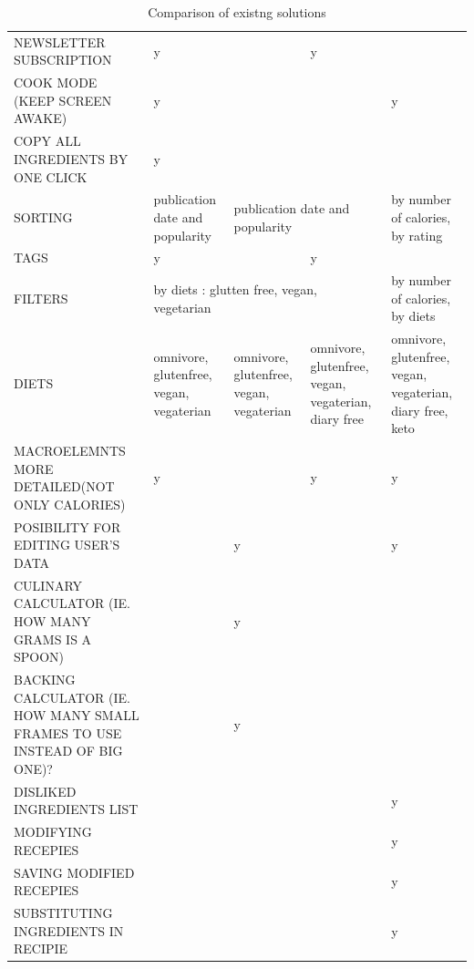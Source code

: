 \begin{landscape}
\begin{table}[H]
{\begin{tabular}{lllll}
NEWSLETTER SUBSCRIPTION                                                     & y             &                               & y                            &            \\
COOK MODE (KEEP SCREEN AWAKE)                                               & y             &                               &                              & y          \\
COPY ALL INGREDIENTS BY ONE CLICK                                           & y             &                               &                              &            \\
SORTING &
  publication date and popularity &
  \multicolumn{2}{l}{publication date and popularity} &
  by number of calories, by rating \\
TAGS                                                                        & y             &                               & y                            &            \\
FILTERS &
  \multicolumn{3}{l}{by diets : glutten free, vegan,   vegetarian} &
  by number of calories, by diets \\
DIETS &
  omnivore, glutenfree, vegan, vegaterian &
  omnivore, glutenfree, vegan, vegaterian &
  omnivore, glutenfree, vegan, vegaterian, diary free &
  omnivore, glutenfree, vegan, vegaterian, diary free, keto \\
MACROELEMNTS MORE DETAILED(NOT ONLY   CALORIES)                             & y             &                               & y                            & y          \\
POSIBILITY FOR EDITING USER'S DATA                                          &               & y                             &                              & y          \\
CULINARY CALCULATOR (IE. HOW MANY GRAMS   IS A SPOON)                       &               & y                             &                              &            \\
BACKING CALCULATOR (IE. HOW MANY SMALL   FRAMES TO USE INSTEAD OF BIG ONE)? &               & y                             &                              &            \\
DISLIKED INGREDIENTS LIST                                                   &               &                               &                              & y          \\
MODIFYING RECEPIES                                                          &               &                               &                              & y          \\
SAVING MODIFIED RECEPIES                                                    &               &                               &                              & y          \\
SUBSTITUTING INGREDIENTS IN RECIPIE                                         &               &                               &                              & y         
\end{tabular}%
}
\caption{Comparison of existng solutions}
\label{tab:existing_solutions}
\end{table}
\end{landscape}
